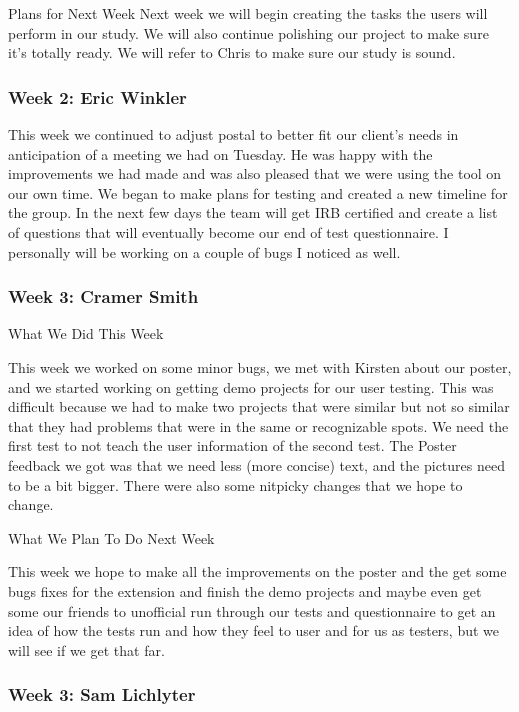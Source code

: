 Plans for Next Week
Next week we will begin creating the tasks the users will perform in our study. We will also continue polishing our project to make sure it's totally ready. We will refer to Chris to make sure our study is sound.

\subsubsection{Week 2: Eric Winkler}

This week we continued to adjust postal to better fit our client's needs in anticipation of a meeting we had on Tuesday. He was happy with the improvements we had made and was also pleased that we were using the tool on our own time. We began to make plans for testing and created a new timeline for the group. In the next few days the team will get IRB certified and create a list of questions that will eventually become our end of test questionnaire. I personally will be working on a couple of bugs I noticed as well.

\subsubsection{Week 3: Cramer Smith}

What We Did This Week

This week we worked on some minor bugs, we met with Kirsten about our poster, and we started working on getting demo projects for our user testing. This was difficult because we had to make two projects that were similar but not so similar that they had problems that were in the same or recognizable spots. We need the first test to not teach the user information of the second test. The Poster feedback we got was that we need less (more concise) text, and the pictures need to be a bit bigger. There were also some nitpicky changes that we hope to change.

What We Plan To Do Next Week

This week we hope to make all the improvements on the poster and the get some bugs fixes for the extension and finish the demo projects and maybe even get some our friends to unofficial run through our tests and questionnaire to get an idea of how the tests run and how they feel to user and for us as testers, but we will see if we get that far.

\subsubsection{Week 3: Sam Lichlyter}

